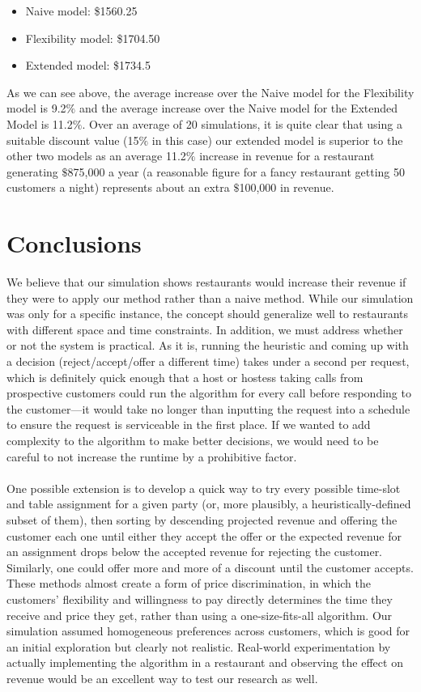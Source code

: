 \documentclass[12pt, titlepage]{article}
\begin{document}
\begin{itemize}
\item Naive model: \$1560.25
\item Flexibility model: \$1704.50
\item Extended model: \$1734.5
\end{itemize}

As we can see above, the average increase over the Naive model for the Flexibility model is 9.2$\%$  and the average increase over the Naive model for the Extended Model is 11.2$\%$. Over an average of 20 simulations, it is quite clear that using a suitable discount value (15$\%$ in this case) our extended model is superior to the other two models as an average 11.2$\%$ increase in revenue for a restaurant generating $\$$875,000 a year (a reasonable figure for a fancy restaurant getting 50 customers a night) represents about an extra $\$$100,000 in revenue.

\section{Conclusions}

We believe that our simulation shows restaurants would increase their revenue if they were to apply our method rather than a naive method. While our simulation was only for a specific instance, the concept should generalize well to restaurants with different space and time constraints. In addition, we must address whether or not the system is practical. As it is, running the heuristic and coming up with a decision (reject/accept/offer a different time) takes under a second per request, which is definitely quick enough that a host or hostess taking calls from prospective customers could run the algorithm for every call before responding to the customer---it would take no longer than inputting the request into a schedule to ensure the request is serviceable in the first place. If we wanted to add complexity to the algorithm to make better decisions, we would need to be careful to not increase the runtime by a prohibitive factor.\\
\\
One possible extension is to develop a quick way to try every possible time-slot and table assignment for a given party (or, more plausibly, a heuristically-defined subset of them), then sorting by descending projected revenue and offering the customer each one until either they accept the offer or the expected revenue for an assignment drops below the accepted revenue for rejecting the customer. Similarly, one could offer more and more of a discount until the customer accepts. These methods almost create a form of price discrimination, in which the customers' flexibility and willingness to pay directly determines the time they receive and price they get, rather than using a one-size-fits-all algorithm. Our simulation assumed homogeneous preferences across customers, which is good for an initial exploration but clearly not realistic. Real-world experimentation by actually implementing the algorithm in a restaurant and observing the effect on revenue would be an excellent way to test our research as well.
\end{document}
